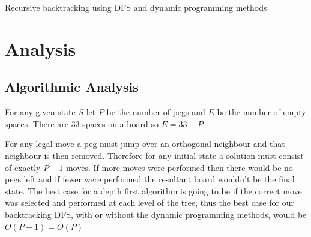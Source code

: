 \documentclass[10pt]{article}
\begin{document}
\begin{algorithm}[H]
	\DontPrintSemicolon
  \label{dyn-alg}
	\caption{Recursive backtracking using DFS and dynamic programming methods}
\end{algorithm}
\newpage
\section{Analysis}
\subsection{Algorithmic Analysis}\label{algo-analysis}
For any given state $S$ let $P$ be the number of pegs and $E$ be the number of empty spaces.
There are 33 spaces on a board so $E=33-P$

For any legal move a peg must jump over an orthogonal neighbour and that neighbour is then removed. Therefore for any initial state a solution must consist of exactly $P-1$ moves. If more moves were performed then there would be no pegs left and if fewer were performed the resultant board wouldn't be the final state.
The best case for a depth first algorithm is going to be if the correct move was selected and performed at each level of the tree, thus the best case for our backtracking DFS, with or without the dynamic programming methods,  would be $O(P-1)=O(P)$
\end{document}
